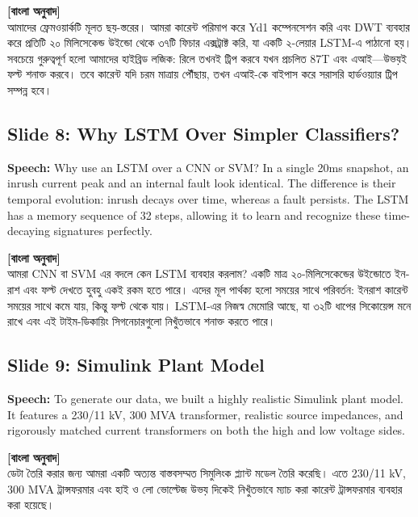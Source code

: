 \documentclass[12pt]{article}
\begin{document}
\begin{bengali}
\textbf{[বাংলা অনুবাদ]} \\
আমাদের ফ্রেমওয়ার্কটি মূলত ছয়-স্তরের। আমরা কারেন্ট পরিমাপ করে Yd1 কম্পেনসেশন করি এবং DWT ব্যবহার করে প্রতিটি ২০ মিলিসেকেন্ড উইন্ডো থেকে ৩৭টি ফিচার এক্সট্রাক্ট করি, যা একটি ২-লেয়ার LSTM-এ পাঠানো হয়। সবচেয়ে গুরুত্বপূর্ণ হলো আমাদের হাইব্রিড লজিক: রিলে তখনই ট্রিপ করবে যখন প্রচলিত 87T এবং এআই—উভয়ই ফল্ট শনাক্ত করবে। তবে কারেন্ট যদি চরম মাত্রায় পৌঁছায়, তখন এআই-কে বাইপাস করে সরাসরি হার্ডওয়্যার ট্রিপ সম্পন্ন হবে।
\end{bengali}

\subsection*{Slide 8: Why LSTM Over Simpler Classifiers?}
\textbf{Speech:} Why use an LSTM over a CNN or SVM? In a single 20ms snapshot, an inrush current peak and an internal fault look identical. The difference is their temporal evolution: inrush decays over time, whereas a fault persists. The LSTM has a memory sequence of 32 steps, allowing it to learn and recognize these time-decaying signatures perfectly.

\begin{bengali}
\textbf{[বাংলা অনুবাদ]} \\
আমরা CNN বা SVM এর বদলে কেন LSTM ব্যবহার করলাম? একটি মাত্র ২০-মিলিসেকেন্ডের উইন্ডোতে ইনরাশ এবং ফল্ট দেখতে হুবহু একই রকম হতে পারে। এদের মূল পার্থক্য হলো সময়ের সাথে পরিবর্তন: ইনরাশ কারেন্ট সময়ের সাথে কমে যায়, কিন্তু ফল্ট থেকে যায়। LSTM-এর নিজস্ব মেমোরি আছে, যা ৩২টি ধাপের সিকোয়েন্স মনে রাখে এবং এই টাইম-ডিকায়িং সিগনেচারগুলো নিখুঁতভাবে শনাক্ত করতে পারে।
\end{bengali}

\subsection*{Slide 9: Simulink Plant Model}
\textbf{Speech:} To generate our data, we built a highly realistic Simulink plant model. It features a 230/11 kV, 300 MVA transformer, realistic source impedances, and rigorously matched current transformers on both the high and low voltage sides.

\begin{bengali}
\textbf{[বাংলা অনুবাদ]} \\
ডেটা তৈরি করার জন্য আমরা একটি অত্যন্ত বাস্তবসম্মত সিমুলিংক প্ল্যান্ট মডেল তৈরি করেছি। এতে 230/11 kV, 300 MVA ট্রান্সফরমার এবং হাই ও লো ভোল্টেজ উভয় দিকেই নিখুঁতভাবে ম্যাচ করা কারেন্ট ট্রান্সফরমার ব্যবহার করা হয়েছে।
\end{bengali}
\end{document}
